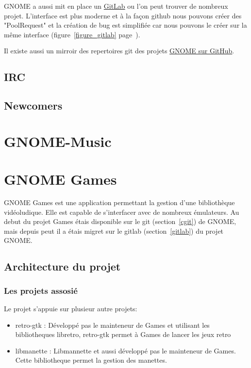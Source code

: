 \documentclass[12pt]{report}
\begin{document}
\label{gitlab}
GNOME a aussi mit en place un \href{https://gitlab.gnome.org/GNOME}{GitLab} 
ou l'on peut trouver de nombreux projet. L'interface est plus moderne 
et à la façon github nous pouvons créer des "PoolRequest" et la création 
de bug est simplifiée car nous pouvons le créer sur la même interface
(figure~\ref{figure_gitlab} page~\pageref{figure_gitlab}).

\label{github}
Il existe aussi un mirroir des repertoires git des projets 
\href{https://github.com/GNOME}{GNOME sur GitHub}.

\subsection{IRC}

\subsection{Newcomers}

\newpage
\section{GNOME-Music}

\newpage
\section{GNOME Games}
GNOME Games est une application permettant la gestion d'une
bibliothèque vidéoludique. Elle est capable de s'interfacer avec de
nombreux émulateurs.
Au debut du projet Games étais disponible sur le git (section~\ref{cgit}) de GNOME, mais 
depuis peut il a étais migret sur le gitlab (section~\ref{gitlab}) du projet GNOME.

\subsection{Architecture du projet}
\subsubsection{Les projets assosié}
Le projet s'appuie sur plusieur autre projets:
\begin{itemize}
\item retro-gtk : Développé pas le mainteneur de Games et utilisant les bibliotheques libretro,
retro-gtk permet à Games de lancer les jeux retro
\item libmanette : Libmannette et aussi développé pas le mainteneur de Games. Cette bibliotheque permet
la gestion des manettes.
\end{itemize}
\end{document}

